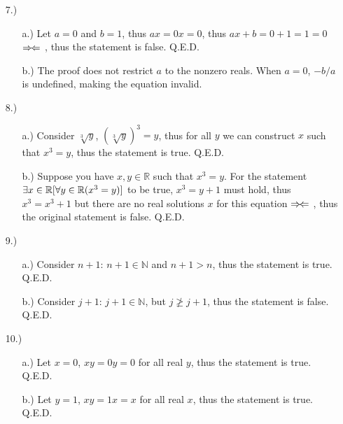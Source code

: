\documentclass[12pt]{article}
\newcommand{\contradiction}{%
    \ensuremath{{\Rightarrow\mspace{-2mu}\Leftarrow}}%
}
\begin{document}
\begin{itemize}
    \pagebreak
    \item [7.)] \begin{itemize}
        \item [a.)] Let $a=0$ and $b=1$, thus $ax=0x=0$, thus $ax+b=0+1=1=0$ \contradiction, thus the statement is false. Q.E.D.

        \item [b.)] The proof does not restrict $a$ to the nonzero reals. When $a=0$, $-b/a$ is undefined, making the equation invalid.
    \end{itemize}

    \item [8.)] \begin{itemize}
        \item [a.)] Consider $\sqrt[3]{y}$, $(\sqrt[3]{y})^3=y$, thus for all $y$ we can construct $x$ such that $x^3=y$, thus the statement is true. Q.E.D.

        \item [b.)] Suppose you have $x,y\in\mathbb{R}$ such that $x^3=y$. For the statement $\exists x\in\mathbb{R}\break[\forall y\in\mathbb{R}(x^3=y)]$ to be true, $x^3=y+1$ must hold, thus $x^3=x^3+1$ but there are no real solutions $x$ for this equation \contradiction, thus the original statement is false. Q.E.D.
    \end{itemize}

    \item [9.)] \begin{itemize}
        \item [a.)] Consider $n+1$: $n+1\in\mathbb{N}$ and $n+1>n$, thus the statement is true. Q.E.D.

        \item [b.)] Consider $j+1$: $j+1\in\mathbb{N}$, but $j\not\geq j+1$, thus the statement is false. Q.E.D.
    \end{itemize}

    \item [10.)] \begin{itemize}
        \item [a.)] Let $x=0$, $xy=0y=0$ for all real $y$, thus the statement is true. Q.E.D.

        \item [b.)] Let $y=1$, $xy=1x=x$ for all real $x$, thus the statement is true. Q.E.D.
    \end{itemize}
\end{itemize}
\end{document}
